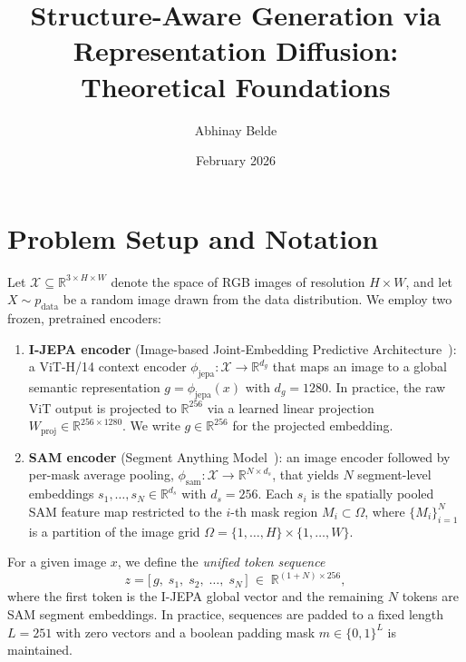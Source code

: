 \documentclass[12pt]{article}
\title{Structure-Aware Generation via Representation Diffusion:\\
Theoretical Foundations}
\author{Abhinay Belde}
\date{February 2026}
\begin{document}
\maketitle

\tableofcontents

\section{Problem Setup and Notation}
\label{sec:setup}

Let $\mathcal{X} \subseteq \mathbb{R}^{3 \times H \times W}$ denote the
space of RGB images of resolution $H \times W$, and let
$X \sim p_{\mathrm{data}}$ be a random image drawn from the data distribution.
We employ two frozen, pretrained encoders:
\begin{enumerate}
    \item \textbf{I-JEPA encoder}
    (Image-based Joint-Embedding Predictive Architecture~\cite{assran2023ijepa}):
    a ViT-H/14 context encoder
    $\phi_{\mathrm{jepa}} : \mathcal{X} \to \mathbb{R}^{d_g}$
    that maps an image to a global semantic representation $g = \phi_{\mathrm{jepa}}(x)$
    with $d_g = 1280$.
    In practice, the raw ViT output is projected to $\mathbb{R}^{256}$ via
    a learned linear projection $W_{\mathrm{proj}} \in \mathbb{R}^{256 \times 1280}$.
    We write $g \in \mathbb{R}^{256}$ for the projected embedding.
    \item \textbf{SAM encoder}
    (Segment Anything Model~\cite{kirillov2023sam}):
    an image encoder followed by per-mask average pooling,
    $\phi_{\mathrm{sam}} : \mathcal{X} \to \mathbb{R}^{N \times d_s}$,
    that yields $N$ segment-level embeddings
    $s_1, \ldots, s_N \in \mathbb{R}^{d_s}$
    with $d_s = 256$.
    Each $s_i$ is the spatially pooled SAM feature map restricted to
    the $i$-th mask region $M_i \subset \Omega$,
    where $\{M_i\}_{i=1}^{N}$ is a partition of the image grid
    $\Omega = \{1,\ldots,H\}\times\{1,\ldots,W\}$.
\end{enumerate}

For a given image $x$, we define the \emph{unified token sequence}
\begin{equation}\label{eq:token-sequence}
    z = \bigl[\, g,\; s_1,\; s_2,\; \ldots,\; s_N \,\bigr]
    \;\in\; \mathbb{R}^{(1+N) \times 256},
\end{equation}
where the first token is the I-JEPA global vector and the remaining
$N$ tokens are SAM segment embeddings.
In practice, sequences are padded to a fixed length $L = 251$ with
zero vectors and a boolean padding mask $m \in \{0,1\}^L$ is maintained.
\end{document}
